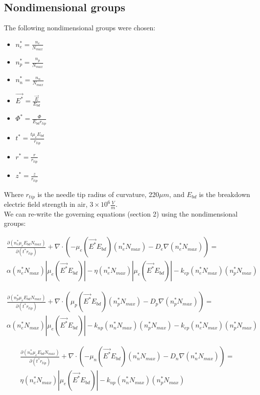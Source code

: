 \documentclass[12pt, a4paper]{report}
\begin{document}
\subsection{Nondimensional groups}
The following nondimensional groups were chosen:

\begin{itemize}
    \item $n_e^* = \frac{n_e}{N_{max}}$
    \item $n_p^* = \frac{n_p}{N_{max}}$
    \item $n_n^* = \frac{n_n}{N_{max}}$
    \item $\vec{E^*} = \frac{\vec{E}}{E_{bd}}$
    \item $\Phi^* = \frac{\Phi}{E_{bd}r_{tip}}$
    \item $t^* = \frac{t\mu_eE_{bd}}{r_{tip}}$
    \item $r^* = \frac{r}{r_{tip}}$
    \item $z^* = \frac{z}{r_{tip}}$
\end{itemize}

\noindent
Where $r_{tip}$ is the needle tip radius of curvature, 220$\mu m$, and $E_{bd}$ is the breakdown electric field strength in air, $3\times10^6 \frac{V}{m}$.\\

\noindent
We can re-write the governing equations (section 2) using the nondimensional groups:

\begin{align*}
        \frac{\partial (n_e^* \mu_e E_{bd} N_{max})}{\partial (t^*r_{tip})} + \nabla \cdot (-\mu_e(\vec{E^*}E_{bd})(n_e^*N_{max}) - D_e\nabla (n_e^*N_{max})) = \\ \alpha (n_e^*N_{max})|\mu_e(\vec{E^*}E_{bd})| -\eta (n_e^*N_{max})|\mu_e(\vec{E^*}E_{bd})| - k_{ep}(n_e^*N_{max})(n_p^*N_{max})
\end{align*}

\begin{align*}
    \frac{\partial (n_p^* \mu_e E_{bd} N_{max})}{\partial (t^*r_{tip})} + \nabla \cdot (\mu_p(\vec{E^*}E_{bd})(n_p^*N_{max}) - D_p\nabla (n_p^*N_{max})) = \\ \alpha (n_e^*N_{max})|\mu_e(\vec{E^*}E_{bd})| - k_{np}(n_n^*N_{max})(n_p^*N_{max}) - k_{ep}(n_e^*N_{max})(n_p^*N_{max})
\end{align*}

\begin{align*}
    \frac{\partial (n_n^* \mu_e E_{bd} N_{max})}{\partial (t^*r_{tip})} + \nabla \cdot (-\mu_n(\vec{E^*}E_{bd})(n_n^*N_{max}) - D_n\nabla (n_n^*N_{max})) = \\ \eta (n_e^*N_{max})|\mu_e(\vec{E^*}E_{bd})| - k_{np}(n_n^*N_{max})(n_p^*N_{max})
\end{align*}
\end{document}
